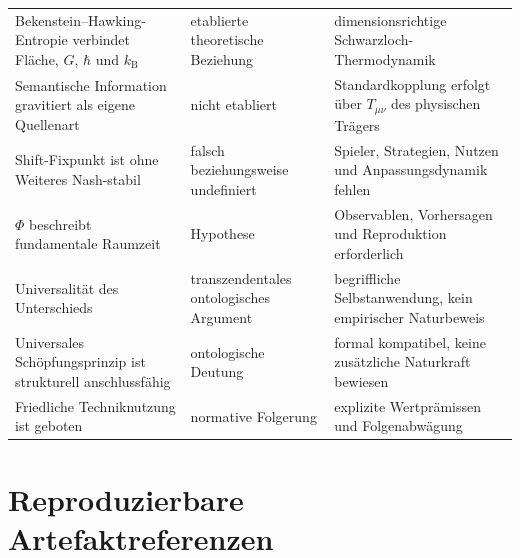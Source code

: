 \documentclass[11pt,a4paper]{article}
\theoremstyle{remark}
\begin{document}
\begin{longtable}{>{\raggedright\arraybackslash}p{}
                  >{\raggedright\arraybackslash}p{}
                  >{\raggedright\arraybackslash}p{}}
Bekenstein--Hawking-Entropie verbindet Fläche, \(G\), \(\hbar\) und \(k_{\mathrm B}\) & etablierte theoretische Beziehung & dimensionsrichtige Schwarzloch-Thermodynamik \\
Semantische Information gravitiert als eigene Quellenart & nicht etabliert & Standardkopplung erfolgt über \(T_{\mu\nu}\) des physischen Trägers \\
Shift-Fixpunkt ist ohne Weiteres Nash-stabil & falsch beziehungsweise undefiniert & Spieler, Strategien, Nutzen und Anpassungsdynamik fehlen \\
\(\Phi\) beschreibt fundamentale Raumzeit & Hypothese & Observablen, Vorhersagen und Reproduktion erforderlich \\
Universalität des Unterschieds & transzendentales ontologisches Argument & begriffliche Selbstanwendung, kein empirischer Naturbeweis \\
Universales Schöpfungsprinzip ist strukturell anschlussfähig & ontologische Deutung & formal kompatibel, keine zusätzliche Naturkraft bewiesen \\
Friedliche Techniknutzung ist geboten & normative Folgerung & explizite Wertprämissen und Folgenabwägung \\
\bottomrule
\end{longtable}

\section{Reproduzierbare Artefaktreferenzen}
\end{document}
